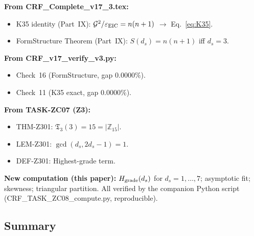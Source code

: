 \documentclass[12pt, a4paper]{article}
\begin{document}
\begin{formalbox}[title={Source Trace}]
\textbf{From CRF\_Complete\_v17\_3.tex:}
\begin{itemize}[leftmargin=*]
  \item K35 identity (Part~IX): $\mathcal{G}^2/\varepsilon_{\rm EIC}
    = n(n+1)$ $\to$ Eq.~\eqref{eq:K35}.
  \item FormStructure Theorem (Part~IX): $S(d_s)=n(n+1)$
    iff $d_s=3$.
\end{itemize}
\textbf{From CRF\_v17\_verify\_v3.py:}
\begin{itemize}[leftmargin=*]
  \item Check~16 (FormStructure, gap $0.0000\%$).
  \item Check~11 (K35 exact, gap $0.0000\%$).
\end{itemize}
\textbf{From TASK-ZC07 (Z3):}
\begin{itemize}[leftmargin=*]
  \item THM-Z301: $\mathfrak{T}_3(3) = 15 = |\mathbb{Z}_{15}|$.
  \item LEM-Z301: $\gcd(d_s, 2d_s-1)=1$.
  \item DEF-Z301: Highest-grade term.
\end{itemize}
\textbf{New computation (this paper):}
$H_{\rm grade}(d_s)$ for $d_s = 1,\ldots,7$; asymptotic fit;
skewness; triangular partition. All verified by the companion
Python script (CRF\_TASK\_ZC08\_compute.py, reproducible).
\end{formalbox}

\subsection{Summary}
\label{sec:summary}
\end{document}
